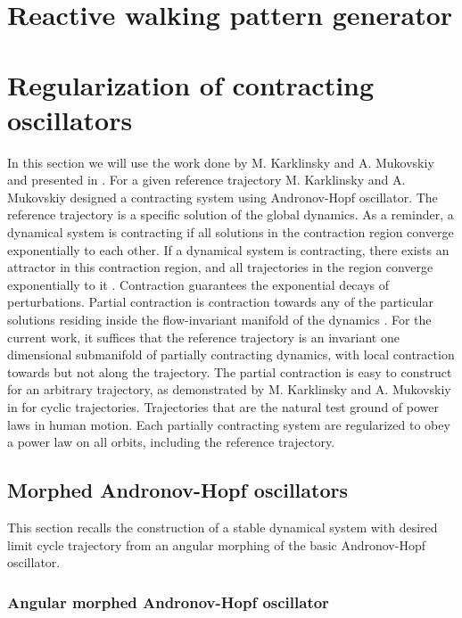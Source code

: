 \section{Reactive walking pattern generator}



\section{Regularization of contracting oscillators}
\label{sec:regularization_contracting_oscillators}

In this section we will use the work done by M. Karklinsky and A. Mukovskiy and presented in \cite{matan:biorob:2016}.
For a given reference trajectory M. Karklinsky and A. Mukovskiy designed a contracting system using Andronov-Hopf oscillator.
The reference trajectory is a specific solution of the global dynamics. 
As a reminder, a dynamical system is contracting if all solutions in the contraction region converge exponentially to each other.
If a dynamical system is contracting, there exists an attractor in this contraction region, and all trajectories in the region converge exponentially to it \cite{lohmiller_contraction_1998}.
Contraction guarantees the exponential decays of
perturbations.
Partial contraction is contraction towards any of the particular solutions residing inside the flow-invariant manifold of the dynamics \cite{pham_stable_2007}.
For the current work, it suffices that the reference trajectory is an invariant one dimensional submanifold of partially contracting dynamics, with local contraction towards but not along the trajectory.
The partial contraction is easy to construct for an arbitrary trajectory, as demonstrated by M. Karklinsky and A. Mukovskiy in \cite{matan:biorob:2016} for cyclic trajectories.
Trajectories that are the natural test ground of power laws in human motion.
Each partially contracting system are regularized to obey a power law on all orbits, including the reference trajectory. 

\subsection{Morphed Andronov-Hopf oscillators}
This section recalls the construction of a stable dynamical system with desired limit cycle trajectory from an angular morphing of the basic Andronov-Hopf oscillator.

\subsubsection*{Angular morphed Andronov-Hopf oscillator}

